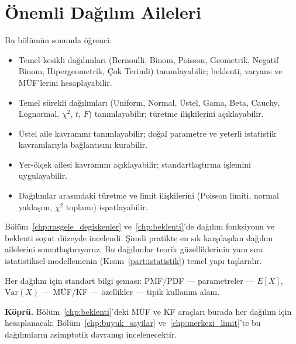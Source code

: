 \chapter{Önemli Dağılım Aileleri}
\label{chp:dagilim_aileleri}


\begin{kazanimlar}
Bu bölümün sonunda öğrenci:
\begin{itemize}
  \item Temel kesikli dağılımları (Bernoulli, Binom, Poisson, Geometrik,
        Negatif Binom, Hipergeometrik, Çok Terimli) tanımlayabilir;
        beklenti, varyans ve MÜF'lerini hesaplayabilir.
  \item Temel sürekli dağılımları (Uniform, Normal, Üstel, Gama, Beta,
        Cauchy, Lognormal, $\chi^2$, $t$, $F$) tanımlayabilir; türetme ilişkilerini açıklayabilir.
  \item Üstel aile kavramını tanımlayabilir; doğal parametre ve yeterli istatistik
        kavramlarıyla bağlantısını kurabilir.
  \item Yer-ölçek ailesi kavramını açıklayabilir; standartlaştırma işlemini uygulayabilir.
  \item Dağılımlar arasındaki türetme ve limit ilişkilerini (Poisson limiti,
        normal yaklaşım, $\chi^2$ toplamı) ispatlayabilir.
\end{itemize}
\end{kazanimlar}

\begin{motivasyon}
Bölüm~\ref{chp:rasgele_degiskenler} ve~\ref{chp:beklenti}'de dağılım fonksiyonu
ve beklenti soyut düzeyde incelendi. Şimdi pratikte en sık karşılaşılan dağılım
ailelerini somutlaştırıyoruz. Bu dağılımlar teorik güzelliklerinin yanı sıra
istatistiksel modellemenin (Kısım~\ref{part:istatistik}) temel yapı taşlarıdır.

Her dağılım için standart bilgi şeması: PMF/PDF --- parametreler --- $E[X]$, $\mathrm{Var}(X)$ ---
MÜF/KF --- özellikler --- tipik kullanım alanı.

\medskip
\textbf{Köprü.} Bölüm~\ref{chp:beklenti}'deki MÜF ve KF araçları burada her dağılım
için hesaplanacak; Bölüm~\ref{chp:buyuk_sayilar} ve~\ref{chp:merkezi_limit}'te
bu dağılımların asimptotik davranışı incelenecektir.
\end{motivasyon}

